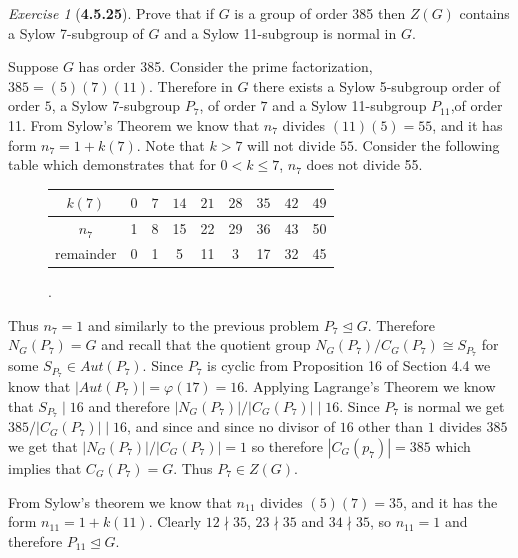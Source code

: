 \documentclass[12pt]{amsart}
\makeatletter
\theoremstyle{remark}
\newtheorem*{exercise}{Exercise}%
\renewenvironment{proof}[1][\proofname]{\par\doublespacing
  \pushQED{\qed}%
  \normalfont \topsep6\p@\@plus6\p@\relax
  \list{}{%
    \settowidth{\leftmargin}{\itshape\proofname:\hskip\labelsep}%
    \setlength{\labelwidth}{0pt}%
    \setlength{\itemindent}{-\leftmargin}%
  }%
  \item[\hskip\labelsep\itshape#1\@addpunct{:}]\ignorespaces
}{%
  \popQED\endlist\@endpefalse
  \singlespacing
}
\theoremstyle{mycomment}
\makeatother
\begin{document}
\begin{exercise}[\textbf{4.5.25}] Prove that if $G$ is a group of order 385 then $Z(G)$ contains a Sylow 7-subgroup 
  of $G$ and a Sylow 11-subgroup is normal in $G$. 
   \begin{proof}Suppose $G$ has order 385. Consider the prime factorization, $385 = (5)(7)(11)$.
    Therefore in $G$ there exists a Sylow 5-subgroup order of order $5$, a Sylow 7-subgroup $P_7$, of order $7$
    and a Sylow 11-subgroup $P_{11}$,of order 11. From Sylow's Theorem we know that $n_{7}$ divides $(11)(5) = 55$, and it 
    has form $n_{7} = 1 + k(7)$. Note that $k > 7$ will not divide $55$. Consider the following table which demonstrates that 
    for $0<k\leq7$, $n_7$ does not divide 55.  
    \begin{figure}[H]
      \begin{tabular}{ c || c | c | c | c | c | c | c | c} 
        $k(7)$ & $0$ &$7$ &$14$& $21$& $28$& $35$& $42$& $49$\\
        \hline
        $n_{7}$ & 1& 8& 15& 22& 29& 36& 43& 50\\
        \hline
        remainder & 0 & 1& 5& 11 & 3 & 17 & 32& 45 
      \end{tabular}.
    \end{figure}
    Thus $n_{7} = 1$ and similarly to the previous problem $P_7 \trianglelefteq G$. Therefore $N_G(P_7) = G$ and recall that 
    the quotient group $N_G(P_7)/C_G(P_7) \cong S_{P_7}$ for some $S_{P_7} \in Aut(P_7)$. Since $P_7$ is cyclic from Proposition 16 of 
    Section 4.4 we know that $|Aut(P_7)| = \varphi(17) = 16$. Applying Lagrange's Theorem we know that  $S_{P_7} \mid 16$ and therefore 
    $|N_G(P_7)|/|C_G(P_7)| \mid 16$. Since $P_7$ is normal we get  $385/|C_G(P_7)| \mid 16$, and since and since no divisor of $16$ other than $1$ divides $385$
    we get that $|N_G(P_7)|/|C_G(P_7)| = 1$ so therefore $|C_G(p_7)| = 385$ which implies that $C_G(P_7) = G$. Thus $P_7 \in Z(G)$.


    From Sylow's theorem we know that $n_{11}$ divides $(5)(7) = 35$, and it has the form $n_{11} = 1 + k(11)$. Clearly $12 \nmid 35$, 
    $23 \nmid 35$ and $34 \nmid 35$, so $n_{11} = 1$ and therefore $P_{11} \trianglelefteq G$. 
    \end{proof}
\end{exercise}
\vspace{.15in}
\end{document}
